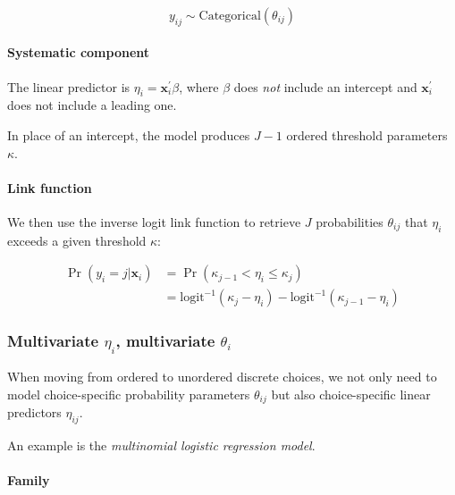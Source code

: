 \documentclass[
  11pt,
]{article}
\begin{document}
\[y_{ij} \sim \text{Categorical}(\theta_{ij})\]

\hypertarget{systematic-component}{%
\paragraph{Systematic component}\label{systematic-component}}

The linear predictor is \(\eta_i = \mathbf{x}_i^{\prime}\beta\), where \(\beta\) does \emph{not} include an intercept and \(\mathbf{x}_i^{\prime}\) does not include a leading one.

In place of an intercept, the model produces \(J-1\) ordered threshold parameters \(\kappa\).

\hypertarget{link-function}{%
\paragraph{Link function}\label{link-function}}

We then use the inverse logit link function to retrieve \(J\) probabilities \(\theta_{ij}\) that \(\eta_i\) exceeds a given threshold \(\kappa\):

\[\begin{split}\Pr(y_i = j | \mathbf{x}_i) & =\Pr(\kappa_{j-1} < \eta_i \leq \kappa_j) \\ & =\text{logit}^{-1} (\kappa_j - \eta_i) - \text{logit}^{-1} (\kappa_{j-1} - \eta_i)\end{split}\]

\hypertarget{multivariate-eta_i-multivariate-theta_i}{%
\subsubsection{\texorpdfstring{Multivariate \(\eta_i\), multivariate \(\theta_i\)}{Multivariate \textbackslash eta\_i, multivariate \textbackslash theta\_i}}\label{multivariate-eta_i-multivariate-theta_i}}

When moving from ordered to unordered discrete choices, we not only need to model choice-specific probability parameters \(\theta_{ij}\) but also choice-specific linear predictors \(\eta_{ij}\).

An example is the \emph{multinomial logistic regression model}.

\hypertarget{family-2}{%
\paragraph{Family}\label{family-2}}
\end{document}
